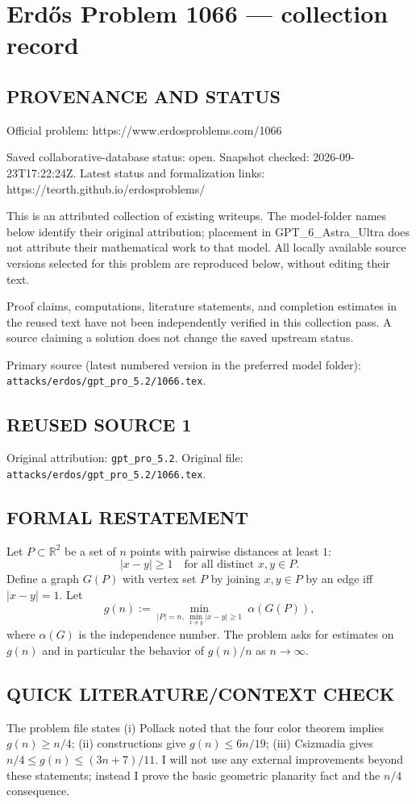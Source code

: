 \section*{Erd\H{o}s Problem 1066 --- collection record}

\subsection*{PROVENANCE AND STATUS}
Official problem: https://www.erdosproblems.com/1066

Saved collaborative-database status: open.
Snapshot checked: 2026-09-23T17:22:24Z.
Latest status and formalization links: https://teorth.github.io/erdosproblems/

This is an attributed collection of existing writeups. The model-folder names below identify their original attribution; placement in GPT\_6\_Astra\_Ultra does not attribute their mathematical work to that model. All locally available source versions selected for this problem are reproduced below, without editing their text.

Proof claims, computations, literature statements, and completion estimates in the reused text have not been independently verified in this collection pass. A source claiming a solution does not change the saved upstream status.

Primary source (latest numbered version in the preferred model folder): \texttt{attacks/erdos/gpt\_pro\_5.2/1066.tex}.

\subsection*{REUSED SOURCE 1}
Original attribution: \texttt{gpt\_pro\_5.2}.
Original file: \texttt{attacks/erdos/gpt\_pro\_5.2/1066.tex}.


\subsection*{FORMAL RESTATEMENT}
Let $P\subset\mathbb{R}^2$ be a set of $n$ points with pairwise distances at least $1$:
\[
|x-y|\ge 1\quad\text{for all distinct }x,y\in P.
\]
Define a graph $G(P)$ with vertex set $P$ by joining $x,y\in P$ by an edge iff $|x-y|=1$.
Let
\[
 g(n) := \min_{|P|=n,\ \min_{x\ne y}|x-y|\ge 1}\ \alpha(G(P)),
\]
where $\alpha(G)$ is the independence number.
The problem asks for estimates on $g(n)$ and in particular the behavior of $g(n)/n$ as $n\to\infty$.

\subsection*{QUICK LITERATURE/CONTEXT CHECK}
The problem file states (i) Pollack noted that the four color theorem implies $g(n)\ge n/4$; (ii) constructions give $g(n)\le 6n/19$; (iii) Csizmadia gives $n/4\le g(n)\le (3n+7)/11$.  I will not use any external improvements beyond these statements; instead I prove the basic geometric planarity fact and the $n/4$ consequence.

